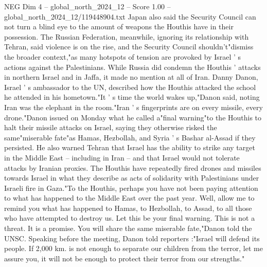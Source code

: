 \begin{textsample}{NEG Dim 4 – global\_north\_2024\_12 – Score 1.00 – global\_north\_2024\_12/119448904.txt}
Japan also said the Security Council can not turn a blind eye to the amount of weapons the Houthis have in their possession.
The Russian Federation, meanwhile, ignoring its relationship with Tehran, said violence is on the rise, and the Security Council shouldn't"dismiss the broader context,"as many hotspots of tension are provoked by Israel ' s actions against the Palestinians.
While Russia did condemn the Houthis ' attacks in northern Israel and in Jaffa, it made no mention at all of Iran.
Danny Danon, Israel ' s ambassador to the UN, described how the Houthis attacked the school he attended in his hometown."It ' s time the world wakes up,"Danon said, noting Iran was the elephant in the room."Iran ' s fingerprints are on every missile, every drone."Danon issued on Monday what he called a"final warning"to the Houthis to halt their missile attacks on Israel, saying they otherwise risked the same"miserable fate"as Hamas, Hezbollah, and Syria ' s Bashar al-Assad if they persisted.
He also warned Tehran that Israel has the ability to strike any target in the Middle East -- including in Iran -- and that Israel would not tolerate attacks by Iranian proxies.
The Houthis have repeatedly fired drones and missiles towards Israel in what they describe as acts of solidarity with Palestinians under Israeli fire in Gaza."To the Houthis, perhaps you have not been paying attention to what has happened to the Middle East over the past year.
Well, allow me to remind you what has happened to Hamas, to Hezbollah, to Assad, to all those who have attempted to destroy us.
Let this be your final warning.
This is not a threat.
It is a promise.
You will share the same miserable fate,"Danon told the UNSC.
Speaking before the meeting, Danon told reporters :"Israel will defend its people.
If 2,000 km. is not enough to separate our children from the terror, let me assure you, it will not be enough to protect their terror from our strengths."

\end{textsample}
